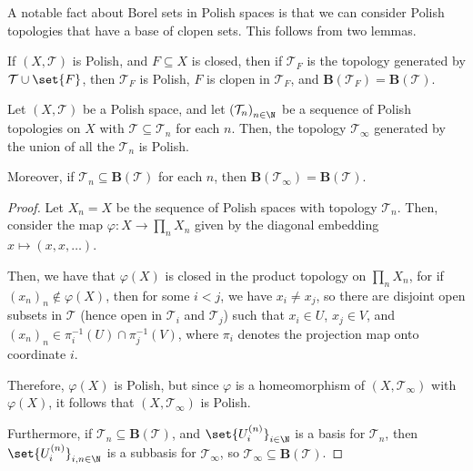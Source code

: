\documentclass[10pt]{mypackage}
\begin{document}
A notable fact about Borel sets in Polish spaces is that we can consider Polish topologies that have a base of clopen sets. This follows from two lemmas.
\begin{lemma}
  If $\left( X,\mathcal{T} \right)$ is Polish, and $F\subseteq X$ is closed, then if $\mathcal{T}_F$ is the topology generated by $\mathcal{T}\cup\set{F}$, then $\mathcal{T}_F$ is Polish, $F$ is clopen in $\mathcal{T}_F$, and $ \mathbf{B}\left( \mathcal{T}_F \right) = \mathbf{B}\left( \mathcal{T} \right) $.
\end{lemma}
\begin{lemma}
  Let $\left( X,\mathcal{T} \right)$ be a Polish space, and let $\left( \mathcal{T}_n \right)_{n\in\N}$ be a sequence of Polish topologies on $X$ with $\mathcal{T}\subseteq \mathcal{T}_n$ for each $n$. Then, the topology $\mathcal{T}_{\infty}$ generated by the union of all the $\mathcal{T}_n$ is Polish.

  Moreover, if $\mathcal{T}_n\subseteq \mathbf{B}\left( \mathcal{T} \right)$ for each $n$, then $ \mathbf{B}\left( \mathcal{T}_{\infty} \right) = \mathbf{B}\left( \mathcal{T} \right) $.
\end{lemma}
\begin{proof}
  Let $X_n = X$ be the sequence of Polish spaces with topology $\mathcal{T}_n$. Then, consider the map $\varphi\colon X\rightarrow \prod_{n}X_n$ given by the diagonal embedding $x\mapsto \left( x,x,\dots \right)$.

  Then, we have that $\varphi \left( X \right)$ is closed in the product topology on $\prod_{n}X_n$, for if $\left( x_n \right)_n\notin \varphi\left( X \right)$, then for some $i < j$, we have $x_i\neq x_j$, so there are disjoint open subsets in $\mathcal{T}$ (hence open in $\mathcal{T}_i$ and $\mathcal{T}_j$) such that $x_i\in U$, $x_j\in V$, and $\left( x_n \right)_n\in \pi_i^{-1}\left( U \right)\cap \pi_j^{-1}\left( V \right)$, where $\pi_i$ denotes the projection map onto coordinate $i$.

  Therefore, $\varphi\left( X \right)$ is Polish, but since $\varphi$ is a homeomorphism of $\left( X,\mathcal{T}_{\infty} \right)$ with $\varphi(X)$, it follows that $\left( X,\mathcal{T}_{\infty} \right)$ is Polish.

  Furthermore, if $ \mathcal{T}_n\subseteq \mathbf{B}\left( \mathcal{T} \right) $, and $\set{U_i^{(n)}}_{i\in \N}$ is a basis for $ \mathcal{T}_n $, then $\set{U_{i}^{(n)}}_{i,n\in\N}$ is a subbasis for $\mathcal{T}_{\infty}$, so $ \mathcal{T}_{\infty}\subseteq \mathbf{B}\left( \mathcal{T} \right) $.
\end{proof}
\end{document}
